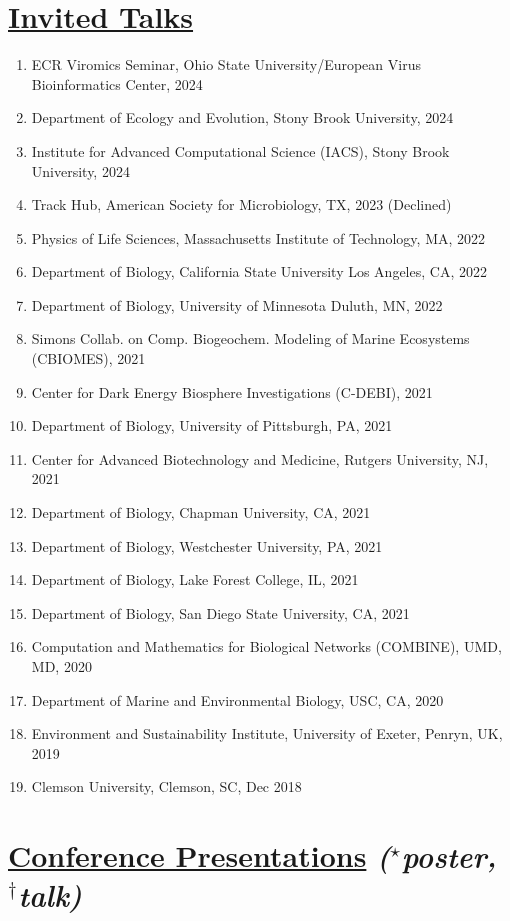 \documentclass[]{res}
\begin{document}
\begin{resume}
   \section{\underline{Invited Talks}} \vspace{2mm}
    \begin{enumerate}[leftmargin=*]
\item ECR Viromics Seminar, Ohio State University/European Virus Bioinformatics Center, 2024
\item Department of Ecology and Evolution, Stony Brook University, 2024
\item Institute for Advanced Computational Science (IACS), Stony Brook University, 2024
\item Track Hub, American Society for Microbiology, TX, 2023 (Declined)
\item Physics of Life Sciences, Massachusetts Institute of Technology, MA, 2022
\item Department of Biology, California State University Los Angeles, CA, 2022
\item Department of Biology, University of Minnesota Duluth, MN, 2022
\item Simons Collab. on Comp. Biogeochem. Modeling of Marine Ecosystems (CBIOMES), 2021
\item Center for Dark Energy Biosphere Investigations (C-DEBI), 2021
\item Department of Biology, University of Pittsburgh, PA, 2021
\item Center for Advanced Biotechnology and Medicine, Rutgers University, NJ, 2021
\item Department of Biology, Chapman University, CA, 2021
\item Department of Biology, Westchester University, PA, 2021
\item Department of Biology, Lake Forest College, IL, 2021
\item Department of Biology, San Diego State University, CA, 2021
\item Computation and Mathematics for Biological Networks (COMBINE), UMD, MD, 2020
\item Department of Marine and Environmental Biology, USC, CA, 2020
\item Environment and Sustainability Institute, University of Exeter, Penryn, UK, 2019
\item Clemson University, Clemson, SC, Dec 2018
\end{enumerate}

 \section{\underline{Conference Presentations} \emph{{($^{\star}$poster, $^{\dagger}$talk)}}} \vspace{2mm}
 

\end{resume}
\end{document}
